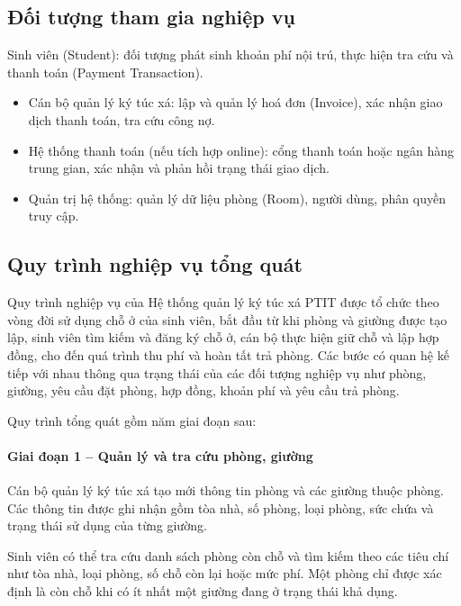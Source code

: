 \subsection{Đối tượng tham gia nghiệp vụ}

Sinh viên (Student): đối tượng phát sinh khoản phí nội trú, thực hiện tra cứu và thanh toán (Payment Transaction).

\begin{itemize}[leftmargin=1.4em]
\item Cán bộ quản lý ký túc xá: lập và quản lý hoá đơn (Invoice), xác nhận giao dịch thanh toán, tra cứu công nợ.
\item Hệ thống thanh toán (nếu tích hợp online): cổng thanh toán hoặc ngân hàng trung gian, xác nhận và phản hồi trạng thái giao dịch.
\item Quản trị hệ thống: quản lý dữ liệu phòng (Room), người dùng, phân quyền truy cập.
\end{itemize}

\subsection{Quy trình nghiệp vụ tổng quát}

Quy trình nghiệp vụ của Hệ thống quản lý ký túc xá PTIT được tổ chức theo vòng đời sử dụng chỗ ở của sinh viên, bắt đầu từ khi phòng và giường được tạo lập, sinh viên tìm kiếm và đăng ký chỗ ở, cán bộ thực hiện giữ chỗ và lập hợp đồng, cho đến quá trình thu phí và hoàn tất trả phòng. Các bước có quan hệ kế tiếp với nhau thông qua trạng thái của các đối tượng nghiệp vụ như phòng, giường, yêu cầu đặt phòng, hợp đồng, khoản phí và yêu cầu trả phòng.

Quy trình tổng quát gồm năm giai đoạn sau:

\paragraph{Giai đoạn 1 – Quản lý và tra cứu phòng, giường}

Cán bộ quản lý ký túc xá tạo mới thông tin phòng và các giường thuộc phòng. Các thông tin được ghi nhận gồm tòa nhà, số phòng, loại phòng, sức chứa và trạng thái sử dụng của từng giường.

Sinh viên có thể tra cứu danh sách phòng còn chỗ và tìm kiếm theo các tiêu chí như tòa nhà, loại phòng, số chỗ còn lại hoặc mức phí. Một phòng chỉ được xác định là còn chỗ khi có ít nhất một giường đang ở trạng thái khả dụng.

